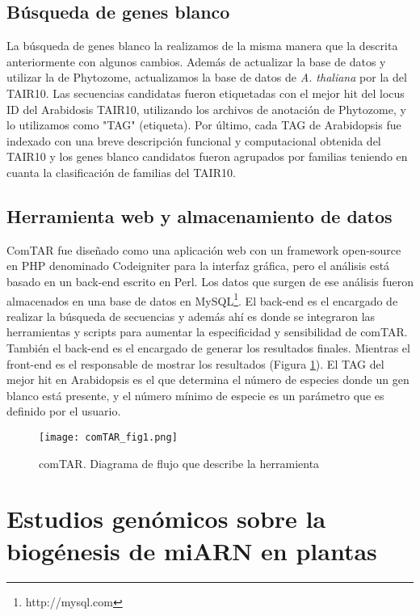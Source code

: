 \subsection{Búsqueda de genes blanco}
La búsqueda de genes blanco la realizamos de la misma manera que la descrita anteriormente con algunos cambios.
Además de actualizar la base de datos y utilizar la de Phytozome, actualizamos la base de datos de \textit{A. thaliana} por la del TAIR10.
Las secuencias candidatas fueron etiquetadas con el mejor hit del locus ID del Arabidosis TAIR10, utilizando los archivos de anotación de Phytozome, y lo utilizamos como "TAG" (etiqueta).
Por último, cada TAG de Arabidopsis fue indexado con una breve descripción funcional y computacional obtenida del TAIR10 y los genes blanco candidatos fueron agrupados por familias teniendo en cuanta la clasificación de familias del TAIR10.

\subsection{Herramienta web y almacenamiento de datos}
ComTAR fue diseñado como una aplicación web con un framework open-source en PHP denominado Codeigniter para la interfaz gráfica, pero el análisis está basado en un back-end escrito en Perl.
Los datos que surgen de ese análisis fueron almacenados en una base de datos en MySQL\footnote{http://mysql.com}.
El back-end es el encargado de realizar la búsqueda de secuencias y además ahí es donde se integraron las herramientas y scripts para aumentar la especificidad y sensibilidad de comTAR. 
También el back-end es el encargado de generar los resultados finales.
Mientras el front-end es el responsable de mostrar los resultados (Figura \ref{fig:comTAR_fig1}).
El TAG del mejor hit en Arabidopsis es el que determina el número de especies donde un gen blanco está presente, y el número mínimo de especie es un parámetro que es definido por el usuario.

\begin{figure}[htbp!] 
    \centering    
    \texttt{[image: comTAR\_fig1.png]}
    \caption[comTAR. Diagrama de flujo]{comTAR. Diagrama de flujo que describe la herramienta}
    \label{fig:comTAR_fig1}
\end{figure}

\section{Estudios genómicos sobre la biogénesis de miARN en plantas}

